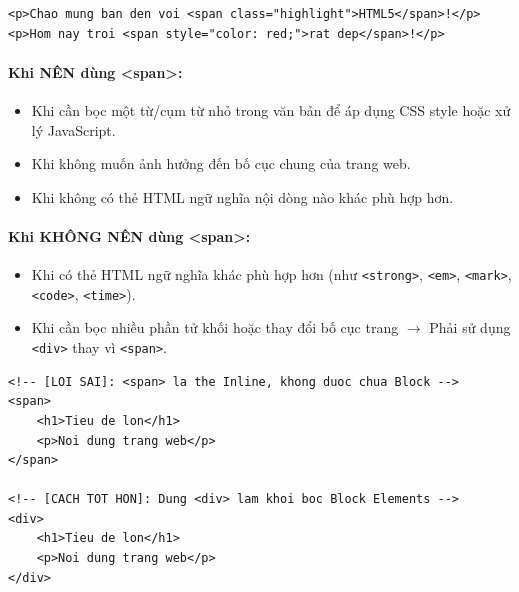 \documentclass[11pt,oneside]{book}
\newcommand{\codeinline}[1]{\textcolor{accentOrange}{\texttt{#1}}}
\begin{document}
\begin{codeWindow}
\begin{lstlisting}[language=HTML5]
<p>Chao mung ban den voi <span class="highlight">HTML5</span>!</p>
<p>Hom nay troi <span style="color: red;">rat dep</span>!</p>
\end{lstlisting}
\end{codeWindow}

\paragraph{Khi NÊN dùng <span>:}
\begin{itemize}[leftmargin=1.8em, itemsep=3pt, parsep=0pt]
    \item Khi cần bọc một từ/cụm từ nhỏ trong văn bản để áp dụng CSS style hoặc xử lý JavaScript.
    \item Khi không muốn ảnh hưởng đến bố cục chung của trang web.
    \item Khi không có thẻ HTML ngữ nghĩa nội dòng nào khác phù hợp hơn.
\end{itemize}

\paragraph{Khi KHÔNG NÊN dùng <span>:}
\begin{itemize}[leftmargin=1.8em, itemsep=3pt, parsep=0pt]
    \item Khi có thẻ HTML ngữ nghĩa khác phù hợp hơn (như \codeinline{<strong>}, \codeinline{<em>}, \codeinline{<mark>}, \codeinline{<code>}, \codeinline{<time>}).
    \item Khi cần bọc nhiều phần tử khối hoặc thay đổi bố cục trang $\rightarrow$ Phải sử dụng \codeinline{<div>} thay vì \codeinline{<span>}.
\end{itemize}

\begin{codeWindow}
\begin{lstlisting}[language=HTML5]
<!-- [LOI SAI]: <span> la the Inline, khong duoc chua Block -->
<span>
    <h1>Tieu de lon</h1>
    <p>Noi dung trang web</p>
</span>

<!-- [CACH TOT HON]: Dung <div> lam khoi boc Block Elements -->
<div>
    <h1>Tieu de lon</h1>
    <p>Noi dung trang web</p>
</div>
\end{lstlisting}
\end{codeWindow}
\end{document}

